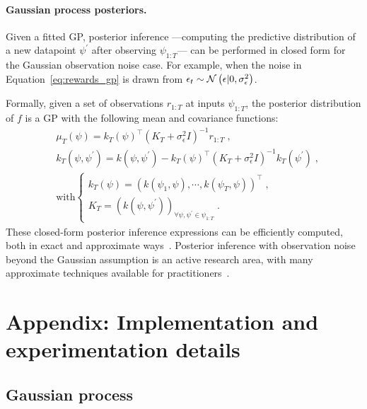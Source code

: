 \paragraph*{Gaussian process posteriors.}\hspace*{-2ex}
Given a fitted GP, posterior inference
---computing the predictive distribution of a new datapoint $\psi^\prime$ after observing $\psi_{1:T}$---
can be performed in closed form for the Gaussian observation noise case.
For example, when the noise in Equation~\eqref{eq:rewards_gp} is \iid drawn from $\epsilon_t \sim \mathcal{N}\left( \epsilon | 0, \sigma_{\epsilon}^2\right)$.

Formally, given a set of observations $r_{1:T}$ at inputs $\psi_{1:T}$,
the posterior distribution of $f$ is a GP with the following mean and covariance functions:
\begin{align}
&\mu_T(\psi) = k_T(\psi)^\top (K_T + \sigma_{\epsilon}^2 I)^{-1}r_{1:T} \; , \nonumber \\
&k_T(\psi, \psi^\prime) = k(\psi,\psi^\prime) - k_T(\psi)^\top (K_T + \sigma_{\epsilon}^2 I)^{-1} k_T(\psi^\prime) \;, \nonumber \\
&\text{with}
\begin{cases}
k_T (\psi) = \left( k(\psi_1, \psi), \cdots, k(\psi_T, \psi)\right)^\top \;,\\
K_T = \left( k(\psi,\psi^\prime) \right)_{\forall \psi, \psi^\prime \in \psi_{1:T}} \;.
\end{cases} 
\label{eq:gp_posterior}
\end{align}
These closed-form posterior inference expressions can be efficiently computed, both in exact and approximate ways~\citep{b-Rasmussen2005,ip-Pleiss2018}.
%
Posterior inference with observation noise beyond the Gaussian assumption is an active research area, with many approximate techniques available for practitioners~\citep{ic-Snelson2006,ip-Titsias2009,ip-Wilson2015,ip-Flaxman2015}.

\clearpage
\section{Appendix: Implementation and experimentation details}
\label{asec:implementation_details}

\subsection{Gaussian process}
\label{asec:implementation_details_gp}

